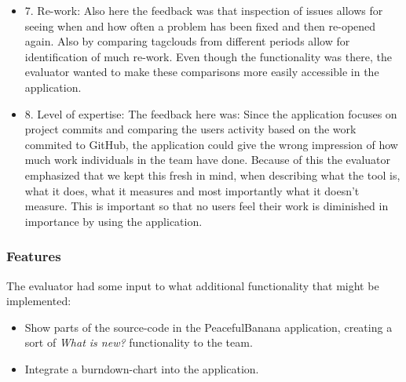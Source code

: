 \begin{itemize}
    \item 7. Re-work: Also here the feedback was that inspection of issues allows for seeing when and how often a problem has been fixed and then re-opened again. Also by comparing tagclouds from different periods allow for identification of much re-work. Even though the functionality was there, the evaluator wanted to make these comparisons more easily accessible in the application. 
\end{itemize}

\begin{itemize}
    \item 8. Level of expertise: The feedback here was: Since the application focuses on project commits and comparing the users activity based on the work commited to GitHub, the application could give the wrong impression of how much work individuals in the team have done. Because of this the evaluator emphasized that we kept this fresh in mind, when describing what the tool is, what it does, what it measures and most importantly what it doesn't measure. This is important so that no users feel their work is diminished in importance by using the application.  
\end{itemize}

\subsubsection{Features}
The evaluator had some input to what additional functionality that might be implemented: 
\begin{itemize}
	\item Show parts of the source-code in the PeacefulBanana application, creating a sort of \emph{What is new?} functionality to the team. 
	\item Integrate a burndown-chart into the application. 
\end{itemize}